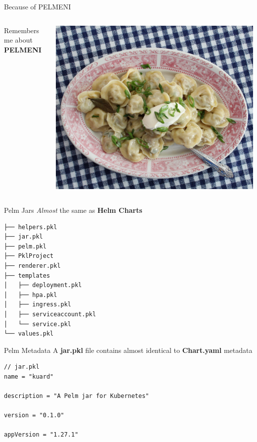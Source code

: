 \documentclass[11pt, aspectratio=169]{beamer}
\begin{document}
\begin{frame}{ Because of PELMENI}
	\begin{columns}
		Remembers me about \textbf{PELMENI}\\~\\
		\centerline{{\Huge {}}}

		\includegraphics[width=\textwidth]{pelmeni.jpeg}
	\end{columns}
\end{frame}
\begin{frame}[fragile]{ Pelm Jars}
	\textit{Almost} the same as \textbf{Helm Charts}
	\begin{verbatim}
├── helpers.pkl
├── jar.pkl
├── pelm.pkl
├── PklProject
├── renderer.pkl
├── templates
│   ├── deployment.pkl
│   ├── hpa.pkl
│   ├── ingress.pkl
│   ├── serviceaccount.pkl
│   └── service.pkl
└── values.pkl
	\end{verbatim}
\end{frame}

\begin{frame}[fragile]{ Pelm Metadata}
	A \textbf{jar.pkl} file contains almost identical to \textbf{Chart.yaml} metadata
	\begin{verbatim}
// jar.pkl
name = "kuard"

description = "A Pelm jar for Kubernetes"

version = "0.1.0"

appVersion = "1.27.1"
	\end{verbatim}
\end{frame}
\end{document}
